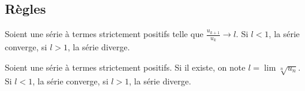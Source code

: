 \documentclass[french]{yLectureNote}
\begin{document}
\subsection{Règles}
\begin{theorem}
 Soient une série à termes strictement positifs telle que \(\frac{u_{k+1}}{u_k} \to l\). Si \(l<1\), la série converge, si \(l>1\), la série diverge.
\end{theorem}
\begin{theorem}
 Soient une série à termes strictement positifs. Si il existe, on note \(l = \lim \sqrt[n]{u_n}\). Si \(l<1\), la série converge, si \(l>1\), la série diverge.
\end{theorem}
\end{document}
